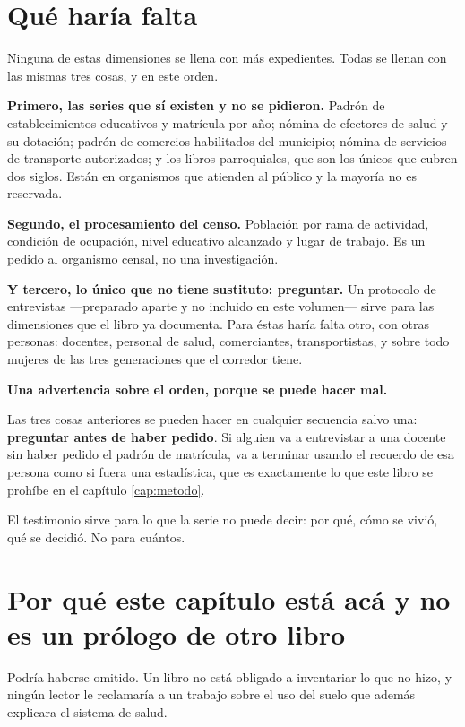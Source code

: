 \section{Qué haría falta}

Ninguna de estas dimensiones se llena con más expedientes. Todas se llenan con las mismas tres
cosas, y en este orden.

\textbf{Primero, las series que sí existen y no se pidieron.} Padrón de establecimientos
educativos y matrícula por año; nómina de efectores de salud y su dotación; padrón de comercios
habilitados del municipio; nómina de servicios de transporte autorizados; y los libros
parroquiales, que son los únicos que cubren dos siglos. Están en organismos que atienden al
público y la mayoría no es reservada.

\textbf{Segundo, el procesamiento del censo.} Población por rama de actividad, condición de
ocupación, nivel educativo alcanzado y lugar de trabajo. Es un pedido al organismo censal, no
una investigación.

\textbf{Y tercero, lo único que no tiene sustituto: preguntar.} Un protocolo de entrevistas ---preparado aparte y no incluido en este volumen--- sirve para las dimensiones que el libro ya documenta. Para éstas haría
falta otro, con otras personas: docentes, personal de salud, comerciantes, transportistas, y
sobre todo mujeres de las tres generaciones que el corredor tiene.

\begin{cautela}
\textbf{Una advertencia sobre el orden, porque se puede hacer mal.}

Las tres cosas anteriores se pueden hacer en cualquier secuencia salvo una: \textbf{preguntar
antes de haber pedido}. Si alguien va a entrevistar a una docente sin haber pedido el padrón de
matrícula, va a terminar usando el recuerdo de esa persona como si fuera una estadística, que es
exactamente lo que este libro se prohíbe en el capítulo \ref{cap:metodo}.

El testimonio sirve para lo que la serie no puede decir: por qué, cómo se vivió, qué se decidió.
No para cuántos.
\end{cautela}

\section{Por qué este capítulo está acá y no es un prólogo de otro libro}

Podría haberse omitido. Un libro no está obligado a inventariar lo que no hizo, y ningún lector
le reclamaría a un trabajo sobre el uso del suelo que además explicara el sistema de salud.

